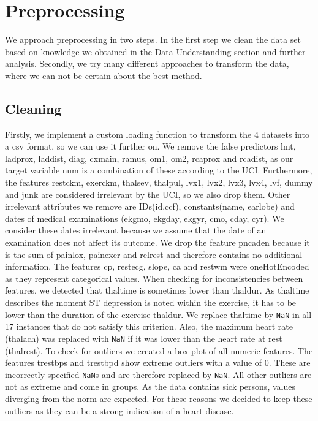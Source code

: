\chapter{Preprocessing}
We approach preprocessing in two steps. In the first step we clean the data set based on knowledge we obtained in the Data Understanding section and further analysis. 
Secondly, we try many different approaches to transform the data, where we can not be certain about the best method. 

\section{Cleaning}
Firstly, we implement a custom loading function to transform the 4 datasets into a csv format, so we can use it further on.
We remove the false predictors lmt, ladprox, laddist, diag, cxmain, ramus, om1, om2, rcaprox and rcadist, as our target variable num is a combination of these according to the UCI. %
Furthermore, the features restckm, exerckm, thalsev, thalpul, lvx1, lvx2, lvx3, lvx4, lvf, dummy and junk are considered irrelevant by the UCI, so we also drop them. Other irrelevant attributes we remove are IDs(id,ccf), constants(name, earlobe) and dates of medical examinations (ekgmo, ekgday, ekgyr, cmo, cday, cyr). We consider these dates irrelevant because we assume that the date of  an examination does not affect its outcome. 
We drop the feature pncaden because it is the sum of painlox, painexer and relrest and therefore contains no additional information. 
The features cp, restecg, slope, ca and restwm were oneHotEncoded as they represent categorical values.
When checking for inconsistencies between features, we detected that thaltime is sometimes lower than thaldur. As thaltime describes the moment ST depression is noted within the exercise, it has to be lower than the duration of the exercise thaldur. We replace thaltime by \texttt{NaN} in all 17 instances that do not satisfy this criterion. 
Also, the maximum heart rate (thalach) was replaced with \texttt{NaN} if it was lower than the heart rate at rest (thalrest).
To check for outliers we created a box plot of all numeric features. The features trestbps and trestbpd show extreme outliers with a value of 0. These are incorrectly specified \texttt{NaN}s and are therefore replaced by \texttt{NaN}. All other outliers are not as extreme and come in groups. As the data contains sick persons, values diverging from the norm are expected. For these reasons we decided to keep these outliers as they can be a strong indication of a heart disease.
